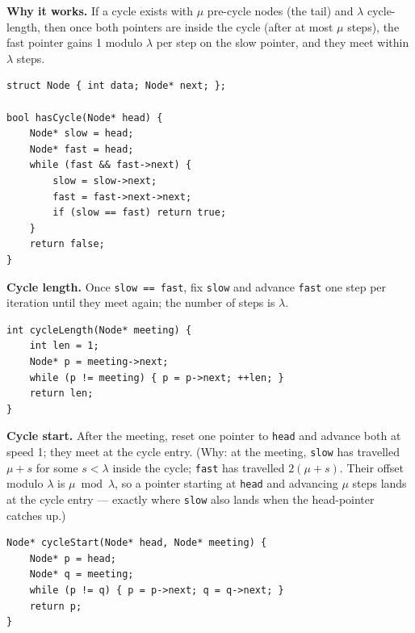 \documentclass[11pt]{article}
\begin{document}
\textbf{Why it works.} If a cycle exists with $\mu$ pre-cycle
nodes (the tail) and $\lambda$ cycle-length, then once both
pointers are inside the cycle (after at most $\mu$ steps), the
fast pointer gains 1 modulo $\lambda$ per step on the slow
pointer, and they meet within $\lambda$ steps.

\begin{lstlisting}[basicstyle=\ttfamily\small,frame=single]
struct Node { int data; Node* next; };

bool hasCycle(Node* head) {
    Node* slow = head;
    Node* fast = head;
    while (fast && fast->next) {
        slow = slow->next;
        fast = fast->next->next;
        if (slow == fast) return true;
    }
    return false;
}
\end{lstlisting}

\textbf{Cycle length.} Once \texttt{slow == fast}, fix
\texttt{slow} and advance \texttt{fast} one step per iteration
until they meet again; the number of steps is $\lambda$.

\begin{lstlisting}[basicstyle=\ttfamily\small,frame=single]
int cycleLength(Node* meeting) {
    int len = 1;
    Node* p = meeting->next;
    while (p != meeting) { p = p->next; ++len; }
    return len;
}
\end{lstlisting}

\textbf{Cycle start.} After the meeting, reset one pointer to
\texttt{head} and advance both at speed 1; they meet at the cycle
entry. (Why: at the meeting, \texttt{slow} has travelled
$\mu + s$ for some $s < \lambda$ inside the cycle; \texttt{fast}
has travelled $2(\mu + s)$. Their offset modulo $\lambda$ is
$\mu \bmod \lambda$, so a pointer starting at \texttt{head} and
advancing $\mu$ steps lands at the cycle entry --- exactly where
\texttt{slow} also lands when the head-pointer catches up.)

\begin{lstlisting}[basicstyle=\ttfamily\small,frame=single]
Node* cycleStart(Node* head, Node* meeting) {
    Node* p = head;
    Node* q = meeting;
    while (p != q) { p = p->next; q = q->next; }
    return p;
}
\end{lstlisting}
\end{document}

